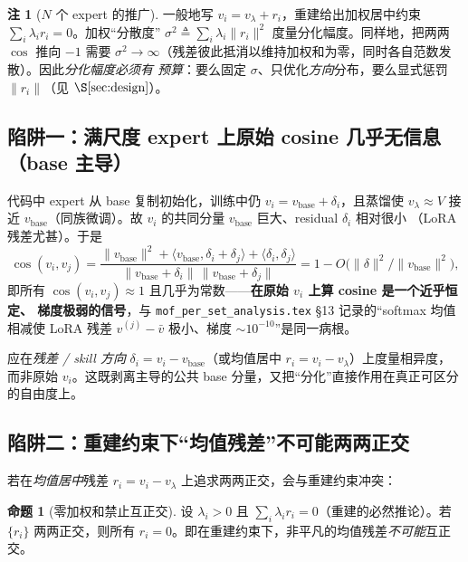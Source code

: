 \documentclass[11pt,a4paper]{article}
\newcommand{\base}{\mathrm{base}}
\newcommand{\vbase}{v_{\base}}
\theoremstyle{definition}
\newtheorem{remark}{注}
\newtheorem{proposition}{命题}
\begin{document}
\begin{remark}[$N$ 个 expert 的推广]
\label{rem:Nblowup}
一般地写 $v_i=v_\lambda+r_i$，重建给出加权居中约束 $\sum_i\lambda_i r_i=0$。加权``分散度''
$\sigma^2\triangleq\sum_i\lambda_i\|r_i\|^2$ 度量分化幅度。同样地，把两两 $\cos$ 推向 $-1$ 需要
$\sigma^2\to\infty$（残差彼此抵消以维持加权和为零，同时各自范数发散）。因此\emph{分化幅度必须有
预算}：要么固定 $\sigma$、只优化\emph{方向}分布，要么显式惩罚 $\|r_i\|$（见 $\S\ref{sec:design}$）。
\end{remark}

\subsection{陷阱一：满尺度 expert 上原始 cosine 几乎无信息（base 主导）}
\label{ssec:basedom}

代码中 expert 从 base 复制初始化，训练中仍 $v_i=\vbase+\delta_i$，且蒸馏使 $v_\lambda\approx V$
接近 $\vbase$（同族微调）。故 $v_i$ 的共同分量 $\vbase$ 巨大、residual $\delta_i$ 相对很小
（LoRA 残差尤甚）。于是
\begin{equation}
\cos(v_i,v_j)=\frac{\|\vbase\|^2+\langle\vbase,\delta_i+\delta_j\rangle+\langle\delta_i,\delta_j\rangle}
{\|\vbase+\delta_i\|\,\|\vbase+\delta_j\|}
=1-O\!\big(\|\delta\|^2/\|\vbase\|^2\big),
\end{equation}
即所有 $\cos(v_i,v_j)\approx1$ 且几乎为常数——\textbf{在原始 $v_i$ 上算 cosine 是一个近乎恒定、
梯度极弱的信号}，与 \texttt{mof\_per\_set\_analysis.tex} §13 记录的``softmax 均值相减使 LoRA 残差
$v^{(j)}-\bar v$ 极小、梯度 $\sim10^{-10}$''是同一病根。

\begin{tcolorbox}[colback=green!5,colframe=green!50!black,title=\textbf{修正：把度量搬到 skill 方向}]
应在\emph{残差 / skill 方向} $\delta_i=v_i-\vbase$（或均值居中 $r_i=v_i-v_\lambda$）上度量相异度，
而非原始 $v_i$。这既剥离主导的公共 base 分量，又把``分化''直接作用在真正可区分的自由度上。
\end{tcolorbox}

\subsection{陷阱二：重建约束下``均值残差''不可能两两正交}
\label{ssec:infeasible}

若在\emph{均值居中}残差 $r_i=v_i-v_\lambda$ 上追求两两正交，会与重建约束冲突：

\begin{proposition}[零加权和禁止互正交]
\label{prop:infeasible}
设 $\lambda_i>0$ 且 $\sum_i\lambda_i r_i=0$（重建的必然推论）。若 $\{r_i\}$ 两两正交，则所有
$r_i=0$。即在重建约束下，非平凡的均值残差\emph{不可能}互正交。
\end{proposition}
\end{document}
